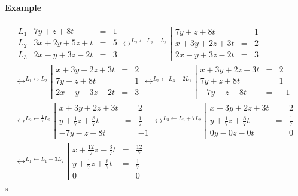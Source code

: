 \paragraph{Example}
\begin{eqnarray*}
  \begin{array}{lrcl}
    L_1 & 7 y + z + 8 t & = & 1 \\
    L_2 & 3 x + 2 y + 5 z + t & = & 5 \\
    L_3 & 2 x - y + 3 z - 2 t & = & 3
  \end{array}
  \leftrightarrow^{L_2 \leftarrow L_2 - L_3}
  \left\vert \begin{array}{rcl}
    7 y + z + 8 t & = & 1 \\
    x + 3 y + 2 z + 3 t & = & 2 \\
    2 x - y + 3 z - 2 t & = & 3
  \end{array} \right. \\
  
  \leftrightarrow^{L_1 \leftrightarrow L_2}
  \left\vert \begin{array}{rcl}
    x + 3 y + 2 z + 3 t & = & 2 \\
    7 y + z + 8 t & = & 1 \\
    2 x - y + 3 z - 2 t & = & 3
  \end{array} \right.
  \leftrightarrow^{L_3 \leftarrow L_3 - 2 L_1}
  \left\vert \begin{array}{rcl}
    x + 3 y + 2 z + 3 t & = & 2 \\
    7 y + z + 8 t & = & 1 \\
    -7 y - z - 8 t & = & -1
  \end{array} \right. \\
  
  \leftrightarrow^{L_2 \leftarrow \frac{1}{7} L_2}
  \left\vert \begin{array}{rcl}
    x + 3 y + 2 z + 3 t & = & 2 \\
    y + \frac{1}{7} z + \frac{8}{7} t & = & \frac{1}{7} \\
    -7 y - z - 8 t & = & -1
  \end{array} \right. 
  \leftrightarrow^{L_3 \leftarrow L_3 + 7 L_2}
  \left\vert \begin{array}{rcl}
    x + 3 y + 2 z + 3 t & = & 2 \\
    y + \frac{1}{7} z + \frac{8}{7} t & = & \frac{1}{7} \\
    0 y - 0 z - 0 t & = & 0
  \end{array} \right. \\
  
  \leftrightarrow^{L_1 \leftarrow L_1 - 3 L_2}
  \left\vert \begin{array}{rcl}
    x + \frac{12}{7} z - \frac{3}{7} t & = & \frac{12}{7} \\
    y + \frac{1}{7} z + \frac{8}{7} t & = & \frac{1}{7} \\
    0 & = & 0
  \end{array} \right.
\end{eqnarray*}s
%
%
